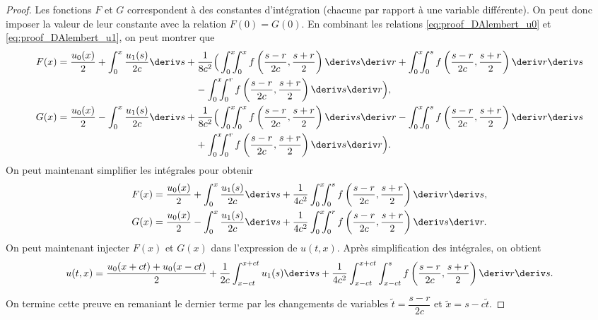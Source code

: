 \documentclass[12pt,a4paper,twoside]{article}
\begin{document}
\begin{proof}
  Les fonctions $F$ et $G$ correspondent \`a des constantes d'int\'egration
  (chacune par rapport \`a une variable diff\'erente).
  On peut donc imposer la valeur de leur constante avec la relation $F(0) = G(0)$.
  En combinant les relations \eqref{eq:proof_DAlembert_u0}
  et \eqref{eq:proof_DAlembert_u1}, on peut montrer que
  \begin{align*}
    F(x) &= \dfrac{u_0(x)}{2} + \int_{0}^{x} \dfrac{u_1(s)}{2c} \deriv s
    + \dfrac{1}{8c^2} \Big(
    \int_0^x \!\!\!\int_0^x f\left(\dfrac{s-r}{2c} , \dfrac{s+r}{2} \right) \deriv s \deriv r
    + \int_0^x \!\!\!\int_0^s f\left(\dfrac{s-r}{2c} , \dfrac{s+r}{2} \right) \deriv r \deriv s
    \\
    & \qquad \qquad \qquad \qquad \qquad \qquad \qquad 
      - \int_0^x \!\!\!\int_0^r f\left(\dfrac{s-r}{2c} , \dfrac{s+r}{2} \right) \deriv s \deriv r
    \Big) ,
    \\
    G(x) &= \dfrac{u_0(x)}{2} - \int_{0}^{x} \dfrac{u_1(s)}{2c} \deriv s
    + \dfrac{1}{8c^2} \Big(
    \int_0^x \!\!\!\int_0^x f\left(\dfrac{s-r}{2c} , \dfrac{s+r}{2} \right) \deriv s \deriv r
    - \int_0^x \!\!\!\int_0^s f\left(\dfrac{s-r}{2c} , \dfrac{s+r}{2} \right) \deriv r \deriv s
    \\
    & \qquad \qquad \qquad \qquad \qquad \qquad \qquad 
      + \int_0^x \!\!\!\int_0^r f\left(\dfrac{s-r}{2c} , \dfrac{s+r}{2} \right) \deriv s \deriv r
    \Big) .
  \end{align*}
  On peut maintenant simplifier les int\'egrales pour obtenir
  \begin{align*}
    F(x) &= \dfrac{u_0(x)}{2} + \int_{0}^{x} \dfrac{u_1(s)}{2c} \deriv s
           + \dfrac{1}{4c^2} 
           \int_0^x \!\!\!\int_0^s f\left(\dfrac{s-r}{2c} , \dfrac{s+r}{2} \right)
           \deriv r \deriv s ,
    \\
    G(x) &= \dfrac{u_0(x)}{2} - \int_{0}^{x} \dfrac{u_1(s)}{2c} \deriv s
           + \dfrac{1}{4c^2}
           \int_0^x \!\!\!\int_0^r f\left(\dfrac{s-r}{2c} , \dfrac{s+r}{2} \right) \deriv s \deriv r .
  \end{align*}
  On peut maintenant injecter $F(x)$ et $G(x)$ dans l'expression de $u(t,x)$.
  Apr\`es simplification des int\'egrales, on obtient
  \begin{align*}
    u(t,x) = \dfrac{u_0(x+ct) + u_0(x-ct)}{2} + \dfrac{1}{2c} \int_{x-ct}^{x+ct} u_1(s) \deriv s
    + \dfrac{1}{4c^2} \int_{x-ct}^{x+ct} \int_{x-ct}^{s} f\left(\dfrac{s-r}{2c} , \dfrac{s+r}{2}\right)
    \deriv r \deriv s .
  \end{align*}

  On termine cette preuve en remaniant le dernier terme par les changements de variables
  $\tilde{t} = \dfrac{s-r}{2c}$ et $\tilde{x} = s - c \tilde{t}$.
\end{proof}
\end{document}
